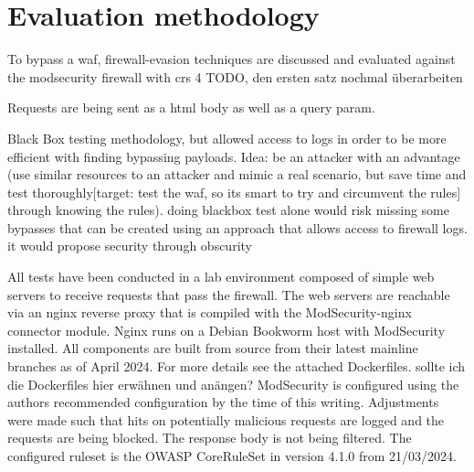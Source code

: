 \section{Evaluation methodology}
\label{sec:evaluation}
To bypass a waf, firewall-evasion techniques are discussed and evaluated against the modsecurity firewall with crs 4 {\color{red} TODO, den ersten satz nochmal überarbeiten}

Requests are being sent as a html body as well as a query param.

Black Box testing methodology, but allowed access to logs in order to be more efficient with finding bypassing payloads. Idea: be an attacker with an advantage (use similar resources to an attacker and mimic a real scenario, but save time and test thoroughly[target: test the waf, so its smart to try and circumvent the rules] through knowing the rules). doing blackbox test alone would risk missing some bypasses that can be created using an approach that allows access to firewall logs. it would propose security through obscurity

All tests have been conducted in a lab environment composed of simple web servers to receive requests that pass the firewall.
The web servers are reachable via an nginx reverse proxy that is compiled with the ModSecurity-nginx connector module. Nginx runs on a Debian Bookworm host with ModSecurity installed.
All components are built from source from their latest mainline branches as of April 2024.
For more details see the attached Dockerfiles.
	{\color{red} sollte ich die Dockerfiles hier erwähnen und anängen?}
ModSecurity is configured using the authors recommended configuration by the time of this writing. \cite{modsec/recconf}
Adjustments were made such that hits on potentially malicious requests are logged and the requests are being blocked. The response body is not being filtered.
The configured ruleset is the OWASP CoreRuleSet in version 4.1.0 from 21/03/2024. \cite{crs/410dl}
